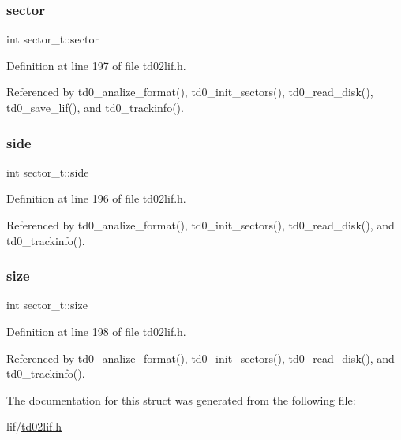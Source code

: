 \mbox{\label{structsector__t_ac4920b9f7c5e2e9d67f3d2aca7a7191f}} 
\subsubsection{\texorpdfstring{sector}{sector}}
{\footnotesize\ttfamily int sector\+\_\+t\+::sector}



Definition at line 197 of file td02lif.\+h.



Referenced by td0\+\_\+analize\+\_\+format(), td0\+\_\+init\+\_\+sectors(), td0\+\_\+read\+\_\+disk(), td0\+\_\+save\+\_\+lif(), and td0\+\_\+trackinfo().

\mbox{\label{structsector__t_a78a5489776ec87f0146b56bf9ed69ee9}} 
\subsubsection{\texorpdfstring{side}{side}}
{\footnotesize\ttfamily int sector\+\_\+t\+::side}



Definition at line 196 of file td02lif.\+h.



Referenced by td0\+\_\+analize\+\_\+format(), td0\+\_\+init\+\_\+sectors(), td0\+\_\+read\+\_\+disk(), and td0\+\_\+trackinfo().

\mbox{\label{structsector__t_ab7886bbfbf6610a6324acbff76cd8fe0}} 
\subsubsection{\texorpdfstring{size}{size}}
{\footnotesize\ttfamily int sector\+\_\+t\+::size}



Definition at line 198 of file td02lif.\+h.



Referenced by td0\+\_\+analize\+\_\+format(), td0\+\_\+init\+\_\+sectors(), td0\+\_\+read\+\_\+disk(), and td0\+\_\+trackinfo().



The documentation for this struct was generated from the following file\+:\begin{DoxyCompactItemize}
\item 
lif/\hyperlink{td02lif_8h}{td02lif.\+h}\end{DoxyCompactItemize}
